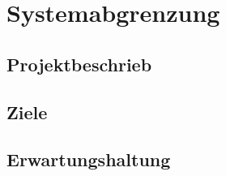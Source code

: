 \section{Systemabgrenzung}
\subsection{Projektbeschrieb}
\subsection{Ziele}
\subsection{Erwartungshaltung}